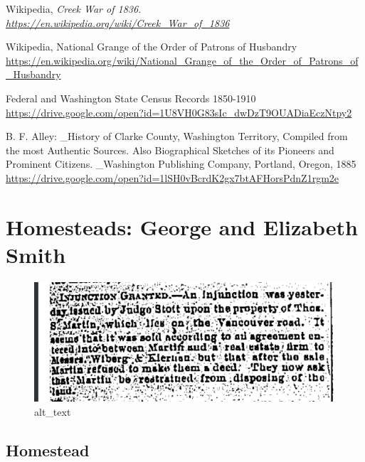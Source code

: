 \documentclass[
  12pt,
]{book}
\begin{document}
Wikipedia, \emph{Creek War of 1836. \url{https://en.wikipedia.org/wiki/Creek_War_of_1836}}

Wikipedia, National Grange of the Order of Patrons of Husbandry \url{https://en.wikipedia.org/wiki/National_Grange_of_the_Order_of_Patrons_of_Husbandry}

Federal and Washington State Census Records 1850-1910 \url{https://drive.google.com/open?id=1U8VH0G83sIc_dwDzT9OUADiaEczNtpy2}

B. F. Alley: \_History of Clarke County, Washington Territory, Compiled from the most Authentic Sources. Also Biographical Sketches of its Pioneers and Prominent Citizens. \_Washington Publishing Company, Portland, Oregon, 1885 \url{https://drive.google.com/open?id=1lSH0vBcrdK2gx7btAFHorsPdnZ1rgm2e}

\hypertarget{homesteads-george-and-elizabeth-smith}{%
\section{Homesteads: George and Elizabeth Smith}\label{homesteads-george-and-elizabeth-smith}}

\begin{figure}
\centering
\includegraphics{images/0203a_images/image1.png}
\caption{alt\_text}
\end{figure}

\hypertarget{homestead-2}{%
\subsection{Homestead}\label{homestead-2}}
\end{document}

